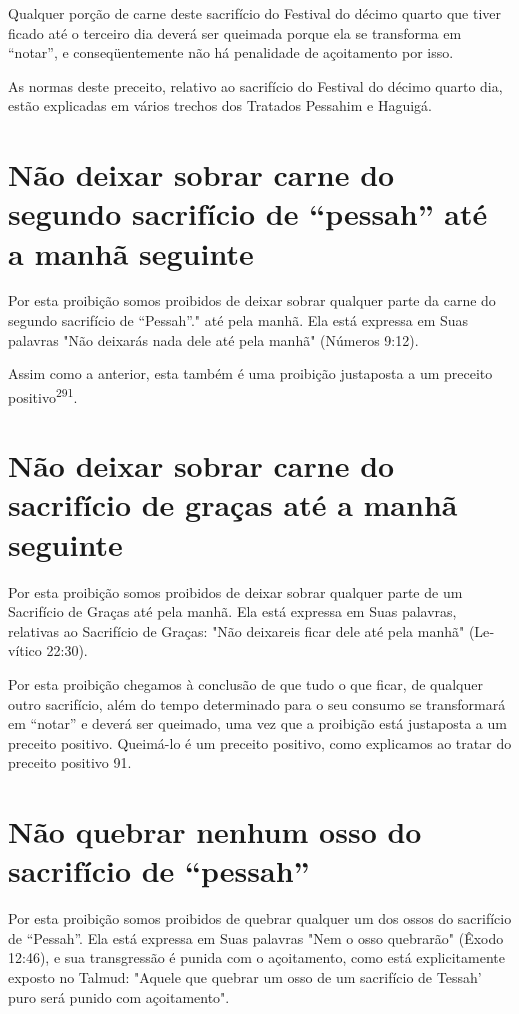 Qualquer porção de carne deste sacrifício do Festival do décimo quar­to
que tiver ficado até o terceiro dia deverá ser queimada porque ela se
trans­forma em ``notar'', e conseqüentemente não há penalidade de
açoitamento por isso.

As normas deste preceito, relativo ao sacrifício do Festival do déci­mo
quarto dia, estão explicadas em vários trechos dos Tratados Pessahim e
Haguigá.

\section{Não deixar sobrar carne do segundo sacrifício de ``pessah'' até a manhã seguinte}


Por esta proibição somos proibidos de deixar sobrar qualquer parte da
carne do segundo sacrifício de ``Pessah''." até pela
manhã. Ela está expressa em Suas palavras "Não deixarás nada dele até
pela manhã" (Números 9:12).

Assim como a anterior, esta também é uma proibição justaposta a um
preceito positivo\textsuperscript{291}.

\section{Não deixar sobrar carne do sacrifício de graças até a manhã seguinte}

Por esta proibição somos proibidos de deixar sobrar qualquer parte de um
Sacrifício de Graças até pela manhã. Ela está expressa em Suas palavras,
relativas ao Sacrifício de Graças: "Não deixareis ficar dele até pela
manhã" (Le­vítico 22:30).

Por esta proibição chegamos à conclusão de que tudo o que ficar, de
qualquer outro sacrifício, além do tempo determinado para o seu consumo
se transformará em ``notar'' e deverá ser queimado, uma vez que a
proibição está justaposta a um preceito positivo. Queimá-lo é um
preceito positivo, co­mo explicamos ao tratar do preceito positivo 91.

\section{Não quebrar nenhum osso do sacrifício de ``pessah''}

Por esta proibição somos proibidos de quebrar qualquer um dos os­sos do
sacrifício de ``Pessah''. Ela está expressa em Suas palavras "Nem o osso
quebrarão" (Êxodo 12:46), e sua transgressão é punida com o açoitamento,
co­mo está explicitamente exposto no Talmud: "Aquele que quebrar um osso
de um sacrifício de Tessah' puro será punido com açoitamento".


